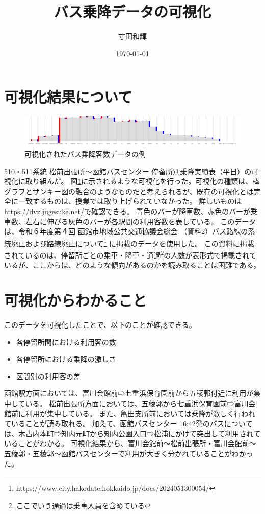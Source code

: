 \documentclass[a4paper,twocolumn,11pt]{ltjsarticle}
\title{バス乗降データの可視化}
\author{寸田和輝}
\date{\today}
\begin{document}
\maketitle

\section{可視化結果について}

\begin{figure}[b]
    \centering
    \includegraphics[width=16cm]{visualize.png}
    \caption{可視化されたバス乗降客数データの例}
    \label{fig:dvz}
\end{figure}

510・511系統 松前出張所～函館バスセンター 停留所別乗降実績表（平日）の可視化に取り組んだ。
図\ref{fig:dvz}に示されるような可視化を行った。可視化の種類は、棒グラフとサンキー図の融合のようなものだと考えられるが、既存の可視化とは完全に一致するものは、授業では取り上げられていなかった。
詳しいものは\url{https://dvz.jugesuke.net/}で確認できる。
青色のバーが降車数、赤色のバーが乗車数、左右に伸びる灰色のバーが各駅間の利用客数を表している。
このデータは、令和６年度第４回 函館市地域公共交通協議会総会 （資料2）バス路線の系統廃止および路線廃止について\footnote{\url{https://www.city.hakodate.hokkaido.jp/docs/2024051300054/}} に掲載のデータを使用した。
この資料に掲載されているのは、停留所ごとの乗車・降車・通過\footnote{ここでいう通過は乗車人員を含めている}の人数が表形式で掲載されているが、ここからは、どのような傾向があるのかを読み取ることは困難である。

\section{可視化からわかること}

このデータを可視化したことで、以下のことが確認できる。

\begin{itemize}
    \item 各停留所間における利用客の数
    \item 各停留所における乗降の激しさ
    \item 区間別の利用客の差
\end{itemize}

函館駅方面においては、富川会館前⇨七重浜保育園前から五稜郭付近に利用が集中している。
松前出張所方面においては、五稜郭から七重浜保育園前⇨富川会館前に利用が集中している。
また、亀田支所前においては乗降が激しく行われていることが読み取れる。
加えて、函館バスセンター 16:42発のバスについては、木古内本町⇨知内元町から知内公園入口⇨松浦にかけて突出して利用されていることがわかる。
可視化結果から、富川会館前～松前出張所・富川会館前～五稜郭・五稜郭～函館バスセンターで利用が大きく分かれていることがわかった。
\end{document}
